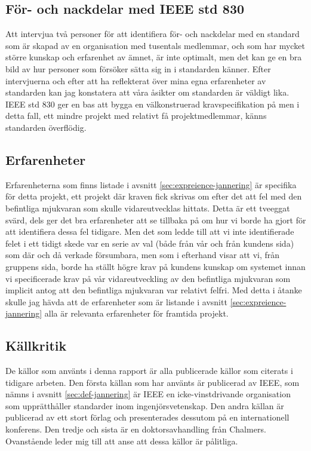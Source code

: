 \subsection{För- och nackdelar med IEEE std 830}
Att intervjua två personer för att identifiera för- och nackdelar med en standard som är skapad av en organisation med tusentals medlemmar, och som har mycket större kunskap och erfarenhet av ämnet, är inte optimalt, men det kan ge en bra bild av hur personer som försöker sätta sig in i standarden känner. Efter intervjuerna och efter att ha reflekterat över mina egna erfarenheter av standarden kan jag konstatera att våra åsikter om standarden är väldigt lika. IEEE std 830 ger en bas att bygga en välkonstruerad kravspecifikation på men i detta fall, ett mindre projekt med relativt få projektmedlemmar, känns standarden överflödig.   
\subsection{Erfarenheter}
Erfarenheterna som finns listade i avsnitt \ref{sec:expreience-jannering} är specifika för detta projekt, ett projekt där kraven fick skrivas om efter det att fel med den befintliga mjukvaran som skulle vidareutvecklas hittats. Detta är ett tveeggat svärd, dels ger det bra erfarenheter att se tillbaka på om hur vi borde ha gjort för att identifiera dessa fel tidigare. Men det som ledde till att vi inte identifierade felet i ett tidigt skede var en serie av val (både från vår och från kundens sida) som där och då verkade försumbara, men som i efterhand visar att vi, från gruppens sida, borde ha ställt högre krav på kundens kunskap om systemet innan vi specificerade krav på vår vidareutveckling av den befintliga mjukvaran som implicit antog att den befintliga mjukvaran var relativt felfri. Med detta i åtanke skulle jag hävda att de erfarenheter som är listande i avsnitt \ref{sec:expreience-jannering} alla är relevanta erfarenheter för framtida projekt.      
\subsection{Källkritik}
De källor som använts i denna rapport är alla publicerade källor som citerats i tidigare arbeten. Den första källan som har använts är publicerad av IEEE, som nämns i avsnitt \ref{sec:def-jannering} är IEEE en icke-vinstdrivande organisation som upprätthåller standarder inom ingenjörsvetenskap. Den andra källan är publicerad av ett stort förlag och presenterades dessutom på en internationell konferens. Den tredje och sista är en doktorsavhandling från Chalmers. Ovanstående leder mig till att anse att dessa källor är pålitliga.      
